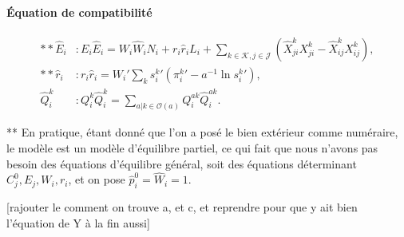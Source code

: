 \paragraph{Équation de compatibilité}
\begin{align}
	** \hat{E}_i & : E_i \hat{E}_i = W_i \hat{W}_i N_i + r_i \hat{r}_i L_i + \sum_{k \in \mathcal{K},j \in \mathcal{J}} \left(\hat{X}_{ji}^k X_{ji}^k - \hat{X}_{ij}^k X_{ij}^k \right), \\
	** \hat{r}_i & : r_i \hat{r}_i= W_i\prime \sum_k {s_i^k}\prime \left( {\pi_i^k}\prime -a^{-1} \ln {s_i^k}\prime\right),                                                              \\
	\hat{Q}_i^k  & : Q_i^k \hat{Q}_i^k= \sum_{a|k\in \mathcal{O}(a)} Q_i^{ak} \hat{Q}_i^{ak}.
\end{align}

** En pratique, étant donné que l'on a posé le bien extérieur comme numéraire, le modèle est un modèle d'équilibre partiel, ce qui fait que nous n'avons pas besoin des équations d'équilibre général, soit des équations déterminant $C_j^0, E_j, W_i, r_i$, et on pose $\hat{p}_i^0=\hat{W}_i=1$.


	[rajouter le comment on trouve a, et c, et reprendre pour que y ait bien l'équation de Y à la fin aussi]